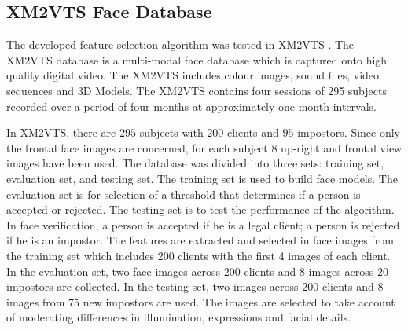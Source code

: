 \subsection{XM2VTS Face Database}
\label{sec:faceveri:xm2vts}
The developed feature selection algorithm was tested in XM2VTS \cite{Messer1999}. The XM2VTS database is a multi-modal face database which is captured onto high quality digital video. The XM2VTS includes colour images, sound files, video sequences and 3D Models. The XM2VTS contains four sessions of 295 subjects recorded over a period of four months at approximately one month intervals.

In XM2VTS, there are $295$ subjects with $200$ clients and $95$ impostors. Since only the frontal face images are concerned, for each subject 8 up-right and frontal view images have been used. The database was divided into three sets: training set, evaluation set, and testing set. The training set is used to build face models. The evaluation set is for selection of a threshold that determines if a person is accepted or rejected. The testing set is to test the performance of the algorithm. In face verification, a person is accepted if he is a legal client; a person is rejected if he is an impostor. The features are extracted and selected in face images from the training set which includes 200 clients with the first 4 images of each client. In the evaluation set, two face images across $200$ clients and $8$ images across $20$ impostors are collected. In the testing set, two images across $200$ clients and $8$ images from 75 new impostors are used. The images are selected to take account of moderating differences in illumination, expressions and facial details. 

